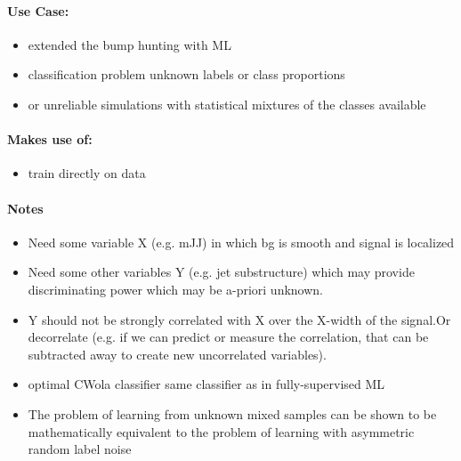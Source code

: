 \paragraph{Use Case:}
\begin{itemize}
  \item extended the bump hunting with ML
  \item classification problem unknown labels or class proportions
  \item or unreliable simulations with statistical mixtures of the classes available
\end{itemize}

\paragraph{Makes use of:}
\begin{itemize}
  \item train directly on data
\end{itemize}

\paragraph{Notes}
\begin{itemize}
\item Need some variable X (e.g. mJJ) in which bg is smooth and signal is localized
\item Need some other variables {Y} (e.g. jet substructure) which may provide discriminating power which may be a-priori unknown.
\item {Y} should not be strongly correlated with X over the X-width of the signal.Or decorrelate (e.g. if we can predict or measure the correlation, that can be subtracted away to create new uncorrelated variables).
\item optimal CWola classifier same classifier as in fully-supervised ML
\item The problem of learning from unknown mixed samples can be shown to be mathematically equivalent to the problem of learning with asymmetric random label noise
\end{itemize}


